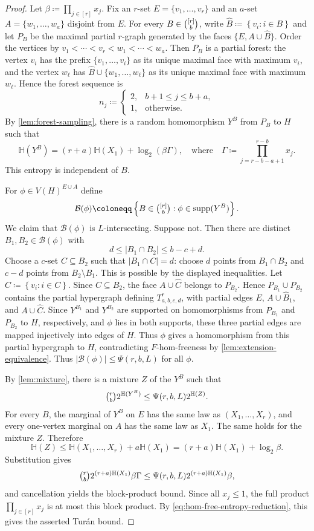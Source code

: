 \documentclass[10pt,a4paper]{article}
\theoremstyle{plain}
\theoremstyle{definition}
\theoremstyle{plain}
\DeclareMathOperator{\supp}{supp}
\newcommand{\calB}{\mathcal B}
\newcommand{\HH}{\mathbb H}
\begin{document}
\begin{proof}
Let $\beta\coloneqq\prod_{j\in [r]} x_j$.  Fix an $r$-set $E=\{v_1,\ldots,v_r\}$ and an $a$-set $A=\{w_1,\ldots,w_a\}$ disjoint from $E$.  For every $B\in\tbinom{[r]}{b}$, write $\hat{B}\coloneqq\left\{v_i:i\in B\right\}$ and let $P_B$ be the maximal partial $r$-graph generated by the faces $\{E, A\cup\hat{B}\}$. 
Order the vertices by $v_1<\cdots<v_r<w_1<\cdots<w_a$.  Then $P_B$ is a partial forest: the vertex $v_i$ has the prefix $\{v_1,\ldots,v_i\}$ as its unique maximal face with maximum $v_i$, and the vertex $w_\ell$ has $\hat{B}\cup\{w_1,\ldots,w_\ell\}$ as its unique maximal face with maximum $w_\ell$.  Hence the forest sequence is
\[
        n_j\coloneqq\begin{cases}2,&b+1\le j\le b+a,\\1,&\text{otherwise.}\end{cases}
\]
By \cref{lem:forest-sampling}, there is a random homomorphism $Y^B$ from $P_B$ to $H$ such that
\[
        \HH(Y^B)=(r+a)\HH(X_1)+\log_2(\beta\Gamma),
        \quad\text{where}\quad 
        \Gamma\coloneqq\prod_{j=r-b-a+1}^{r-b}x_j.
\]
This entropy is independent of $B$.

For $\phi\in V(H)^{E\cup A}$ define
\[
        \calB(\phi)\coloneqq\left\{B\in\tbinom{[r]}{b}:\phi\in\supp(Y^B)\right\}.
\]
We claim that $\calB(\phi)$ is $L$-intersecting.  Suppose not.  Then there are distinct $B_1,B_2\in\calB(\phi)$ with
\[
        d\le |B_1\cap B_2|\le b-c+d.
\]
Choose a $c$-set $C\subseteq B_2$ such that $|B_1\cap C|=d$: choose $d$ points from $B_1\cap B_2$ and $c-d$ points from $B_2\setminus B_1$.  This is possible by the displayed inequalities.  Let $\hat{C}\coloneqq\left\{v_i:i\in C\right\}$.  Since $C\subseteq B_2$, the face $A\cup\hat{C}$ belongs to $P_{B_2}$.  Hence $P_{B_1}\cup P_{B_2}$ contains the partial hypergraph defining $T^r_{a,b,c,d}$, with partial edges $E$, $A\cup\hat{B}_1$, and $A\cup\hat{C}$.  Since $Y^{B_1}$ and $Y^{B_2}$ are supported on homomorphisms from $P_{B_1}$ and $P_{B_2}$ to $H$, respectively, and $\phi$ lies in both supports, these three partial edges are mapped injectively into edges of $H$.  Thus $\phi$ gives a homomorphism from this partial hypergraph to $H$, contradicting $F$-hom-freeness by \cref{lem:extension-equivalence}.  Thus $|\calB(\phi)|\le\Psi(r,b,L)$ for all $\phi$.

By \cref{lem:mixture}, there is a mixture $Z$ of the $Y^B$ such that
\[
        \tbinom{r}{b} 2^{\HH(Y^B)}\le\Psi(r,b,L)2^{\HH(Z)}.
\]
For every $B$, the marginal of $Y^B$ on $E$ has the same law as $(X_1,\ldots,X_r)$, and every one-vertex marginal on $A$ has the same law as $X_1$.  The same holds for the mixture $Z$.  Therefore
\[
        \HH(Z)\le \HH(X_1,\ldots,X_r)+a\HH(X_1)
        =(r+a)\HH(X_1)+\log_2\beta.
\]
Substitution gives
\[
        \tbinom{r}{b} 2^{(r+a)\HH(X_1)}\beta\Gamma
        \le
        \Psi(r,b,L)2^{(r+a)\HH(X_1)}\beta,
\]
and cancellation yields the block-product bound.  Since all $x_j\le1$, the full product $\prod_{j\in [r]} x_j$ is at most this block product.  By \cref{eq:hom-free-entropy-reduction}, this gives the asserted Tur\'an bound.
\end{proof}
\end{document}
